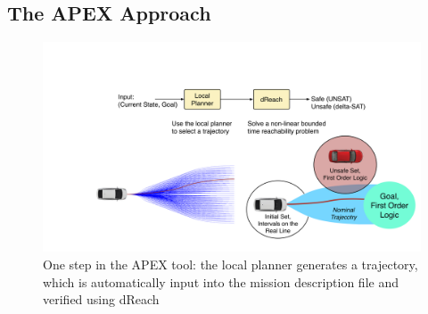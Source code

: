 \subsection{The APEX Approach}
\begin{figure}[!t]
	\includegraphics[width=\columnwidth]{figures/tool_single.png}
	\caption{One step in the APEX tool: the local planner generates a trajectory, which is automatically input into the mission description file and verified using dReach}
	\vspace{-10pt}
	\label{fig:apexsingle}
\end{figure}

